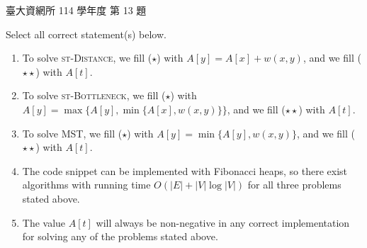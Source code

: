 \begin{pastexam}[label={px:ntu-114-dsa-13}]{臺大資網所 114 學年度 第 13 題}
\begin{itemize}
\end{itemize}
Select all correct statement(s) below.
\begin{enumerate}[label=(\Alph*)]
\item To solve \textsc{st-Distance}, we fill ($\star$) with $A[y]=A[x]+w(x,y)$, and we fill ($\star\star$) with
$A[t]$.
\item To solve \textsc{st-Bottleneck}, we fill ($\star$) with $A[y]=\max\{A[y],\min\{A[x],w(x,y)\}\}$, and we fill
($\star\star$) with $A[t]$.
\item To solve MST, we fill ($\star$) with $A[y]=\min\{A[y],w(x,y)\}$, and we fill ($\star\star$) with $A[t]$.
\item The code snippet can be implemented with Fibonacci heaps, so there exist algorithms with running time
$O(|E|+|V|\log|V|)$ for all three problems stated above.
\item The value $A[t]$ will always be non-negative in any correct implementation for solving any of the problems
stated above.
\end{enumerate}
\end{pastexam}


